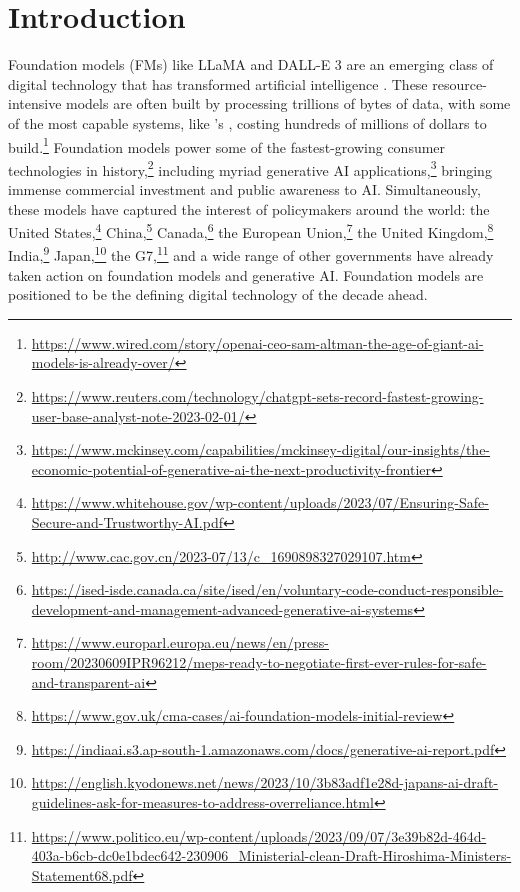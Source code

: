 \hypertarget{introduction}{\section{Introduction}}
\label{sec:introduction}
Foundation models (FMs) like LLaMA and DALL-E 3 are an emerging class of digital technology that has transformed artificial intelligence \citep{bommasani2021opportunities}. 
These resource-intensive models are often built by processing trillions of bytes of data, with some of the most capable systems, like \openai's \gptfour, costing hundreds of millions of dollars to build.\footnote{\url{https://www.wired.com/story/openai-ceo-sam-altman-the-age-of-giant-ai-models-is-already-over/}} 
Foundation models power some of the fastest-growing consumer technologies in history,\footnote{\url{https://www.reuters.com/technology/chatgpt-sets-record-fastest-growing-user-base-analyst-note-2023-02-01/}}
including myriad generative AI applications,\footnote{\url{https://www.mckinsey.com/capabilities/mckinsey-digital/our-insights/the-economic-potential-of-generative-ai-the-next-productivity-frontier}} bringing immense commercial investment and public awareness to AI. 
Simultaneously, these models have captured the interest of policymakers around the world: the United States,\footnote{\url{https://www.whitehouse.gov/wp-content/uploads/2023/07/Ensuring-Safe-Secure-and-Trustworthy-AI.pdf} } China,\footnote{\url{http://www.cac.gov.cn/2023-07/13/c_1690898327029107.htm}} Canada,\footnote{\url{https://ised-isde.canada.ca/site/ised/en/voluntary-code-conduct-responsible-development-and-management-advanced-generative-ai-systems}} the European Union,\footnote{\url{https://www.europarl.europa.eu/news/en/press-room/20230609IPR96212/meps-ready-to-negotiate-first-ever-rules-for-safe-and-transparent-ai}} the United Kingdom,\footnote{\url{https://www.gov.uk/cma-cases/ai-foundation-models-initial-review}} India,\footnote{\url{https://indiaai.s3.ap-south-1.amazonaws.com/docs/generative-ai-report.pdf}} Japan,\footnote{\url{https://english.kyodonews.net/news/2023/10/3b83adf1e28d-japans-ai-draft-guidelines-ask-for-measures-to-address-overreliance.html}} the G7,\footnote{\url{https://www.politico.eu/wp-content/uploads/2023/09/07/3e39b82d-464d-403a-b6cb-dc0e1bdec642-230906_Ministerial-clean-Draft-Hiroshima-Ministers-Statement68.pdf}} and a wide range of other governments have already taken action on foundation models and generative AI.
Foundation models are positioned to be the defining digital technology of the decade ahead.

